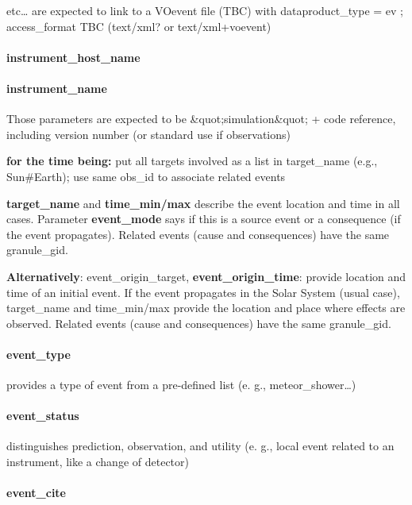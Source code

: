 \documentclass[11pt,a4paper]{ivoa}
\begin{document}
etc… are expected to link to a VOevent file (TBC) with dataproduct\_type = ev ; access\_format TBC (text/xml? or text/xml+voevent)

\paragraph{instrument\_host\_name}

\paragraph{instrument\_name}

Those parameters are expected to be \&quot;simulation\&quot; + code reference, including version number (or standard use if observations)

\textbf{for the time being:} put all targets involved as a list in target\_name (e.g., Sun\#Earth); use same obs\_id to associate related events

\textbf{ target\_name }and\textbf{ time\_min/max} describe the event location and time in all cases. Parameter \textbf{event\_mode} says if this is a source event or a consequence (if the event propagates). Related events (cause and consequences) have the same granule\_gid.

\textbf{}\textbf{Alternatively}: event\_origin\_target, \textbf{event\_origin\_time}: provide location and time of an initial event. If the event propagates in the Solar System (usual case), target\_name and time\_min/max provide the location and place where effects are observed. Related events (cause and consequences) have the same granule\_gid.

\paragraph{event\_type}

provides a type of event from a pre-defined list (e. g., meteor\_shower…)

\paragraph{event\_status}

distinguishes prediction, observation, and utility (e. g., local event related to an instrument, like a change of detector)

\paragraph{event\_cite}
\end{document}
